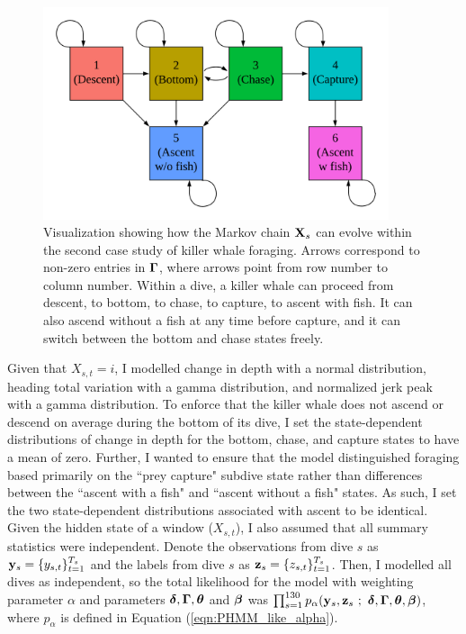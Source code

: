 \begin{figure}
    \centering
    \includegraphics[width = 4in]{plt/PHMM_cs2.png}
    \caption{Visualization showing how the Markov chain $\mathbf{X}_s$ can evolve within the second case study of killer whale foraging. Arrows correspond to non-zero entries in $\boldsymbol{\Gamma}$, where arrows point from row number to column number. Within a dive, a killer whale can proceed from descent, to bottom, to chase, to capture, to ascent with fish. It can also ascend without a fish at any time before capture, and it can switch between the bottom and chase states freely.}
    \label{fig:PHMM_cs2}
\end{figure}


Given that $X_{s,t} = i$, I modelled change in depth with a normal distribution, heading total variation with a gamma distribution, and normalized jerk peak with a gamma distribution. To enforce that the killer whale does not ascend or descend on average during the bottom of its dive, I set the state-dependent distributions of change in depth for the bottom, chase, and capture states to have a mean of zero. Further, I wanted to ensure that the model distinguished foraging based primarily on the ``prey capture" subdive state rather than differences between the ``ascent with a fish" and ``ascent without a fish" states. As such, I set the two state-dependent distributions associated with ascent to be identical. Given the hidden state of a window ($X_{s,t}$), I also assumed that all summary statistics %
were independent. Denote the observations from dive $s$ as $\mathbf{y}_s = \{y_{s,t}\}_{t=1}^{T_s}$ and the labels from dive $s$ as $\mathbf{z}_s = \{z_{s,t}\}_{t=1}^{T_s}$. Then, I modelled all dives as independent, so the total likelihood for the model with weighting parameter $\alpha$ and parameters $\boldsymbol{\delta}, \boldsymbol{\Gamma}, \boldsymbol{\theta}$ and $\boldsymbol{\beta}$ was $\prod_{s=1}^{130} p_\alpha (\mathbf{y}_s,\mathbf{z}_s ~;~ \boldsymbol{\delta}, \boldsymbol{\Gamma}, \boldsymbol{\theta},\boldsymbol{\beta})$, where $p_\alpha$ is defined in Equation (\ref{eqn:PHMM_like_alpha}). 


